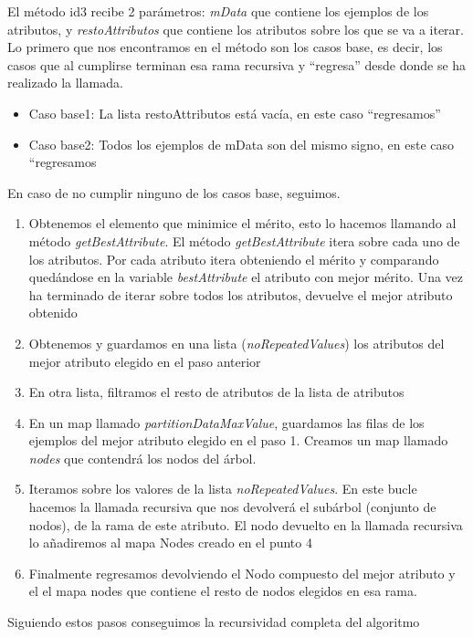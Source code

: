 \documentclass[12pt]{article}
\begin{document}
El método id3 recibe 2 parámetros: \textit{mData} que contiene los ejemplos de los atributos, y \textit{restoAttributos} que contiene los atributos sobre los que se va a iterar.\\
Lo primero que nos encontramos en el método son los casos base, es decir, los casos que al cumplirse terminan esa rama recursiva y “regresa” desde donde se ha realizado la llamada.
\begin{itemize}
    \item Caso base1: La lista restoAttributos está vacía, en este caso “regresamos”
    \item Caso base2: Todos los ejemplos de mData son del mismo signo, en este caso “regresamos
\end{itemize}
En caso de no cumplir ninguno de los casos base, seguimos. 
\begin{enumerate}
    \item Obtenemos el elemento que minimice el mérito, esto lo hacemos llamando al método \textit{getBestAttribute}. El método \textit{getBestAttribute} itera sobre cada uno de los atributos. Por cada atributo itera obteniendo el mérito y comparando quedándose en la variable \textit{bestAttribute} el atributo con mejor mérito. Una vez ha terminado de iterar sobre todos los atributos, devuelve el mejor atributo obtenido
    \item Obtenemos y guardamos en una lista (\textit{noRepeatedValues}) los atributos del mejor atributo elegido en el paso anterior
    \item En otra lista, filtramos el resto de atributos de la lista de atributos
    \item  En un map llamado \textit{partitionDataMaxValue}, guardamos las filas de los ejemplos del mejor atributo elegido en el paso 1. Creamos un map llamado\textit{ nodes} que contendrá los nodos del árbol. 
    \item Iteramos sobre los valores de la lista \textit{noRepeatedValues}. En este bucle hacemos la llamada recursiva que nos devolverá el subárbol (conjunto de nodos), de la rama de este atributo. El nodo devuelto en la llamada recursiva lo añadiremos al mapa Nodes creado en el punto 4
    \item Finalmente regresamos devolviendo el Nodo compuesto del mejor atributo y el el mapa nodes que contiene el resto de nodos elegidos en esa rama. 
\end{enumerate}
Siguiendo estos pasos conseguimos la recursividad completa del algoritmo
\end{document}
